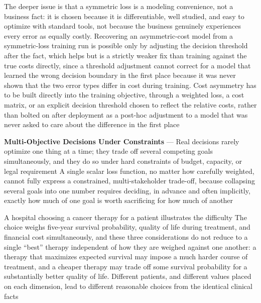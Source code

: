 The deeper issue is that a symmetric loss is a modeling convenience, not a
business fact: it is chosen because it is differentiable, well studied, and easy
to optimize with standard tools, not because the business genuinely experiences
every error as equally costly. Recovering an asymmetric-cost model from a symmetric-loss
training run is possible only by adjusting the decision threshold after the fact,
which helps but is a strictly weaker fix than training against the true costs
directly, since a threshold adjustment cannot correct for a model that learned the
wrong decision boundary in the first place because it was never shown that the two
error types differ in cost during training. Cost asymmetry has to be built
directly into the training objective, through a weighted loss, a cost matrix, or
an explicit decision threshold chosen to reflect the relative costs, rather than
bolted on after deployment as a post-hoc adjustment to a model that was never
asked to care about the difference in the first place

\textbf{Multi-Objective Decisions Under Constraints} --- Real decisions rarely
optimize one thing at a time; they trade off several competing goals simultaneously,
and they do so under hard constraints of budget, capacity, or legal requirement
A single scalar loss function, no matter how carefully weighted, cannot fully express
a constrained, multi-stakeholder trade-off, because collapsing several goals into
one number requires deciding, in advance and often implicitly, exactly how much of
one goal is worth sacrificing for how much of another

A hospital choosing a cancer therapy for a patient illustrates the difficulty
The choice weighs five-year survival probability, quality of life during treatment,
and financial cost simultaneously, and these three considerations do not reduce to
a single ``best'' therapy independent of how they are weighed against one another:
a therapy that maximizes expected survival may impose a much harder course of
treatment, and a cheaper therapy may trade off some survival probability for a substantially
better quality of life. Different patients, and different values placed on each dimension,
lead to different reasonable choices from the identical clinical facts

